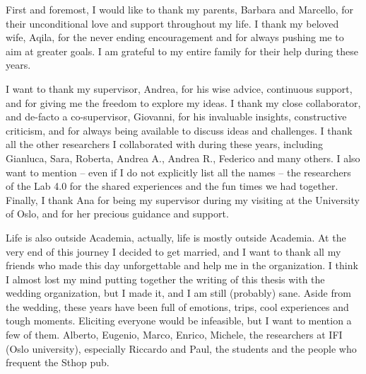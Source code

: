 \documentclass[12pt,a4paper,openright,twoside]{book}
\begin{document}
\begin{acknowledgements} %
    First and foremost, I would like to thank my parents, Barbara and Marcello, for their unconditional love and support throughout my life.
    I thank my beloved wife, Aqila, for the never ending encouragement and for always pushing me to aim at greater goals.
    I am grateful to my entire family for their help during these years.

    I want to thank my supervisor, Andrea, for his wise advice, continuous support, and for giving me the freedom to explore my ideas.
    I thank my close collaborator, and de-facto a co-supervisor, Giovanni, for his invaluable insights, constructive criticism, and for always being available to discuss ideas and challenges.
    I thank all the other researchers I collaborated with during these years, including Gianluca, Sara, Roberta, Andrea A., Andrea R., Federico and many others.
    I also want to mention -- even if I do not explicitly list all the names -- the researchers of the Lab 4.0 for the shared experiences and the fun times we had together.
    Finally, I thank Ana for being my supervisor during my visiting at the University of Oslo, and for her precious guidance and support.

    Life is also outside Academia, actually, life is mostly outside Academia.
    At the very end of this journey I decided to get married, and I want to thank all my friends who made this day unforgettable and help me in the organization.
    I think I almost lost my mind putting together the writing of this thesis with the wedding organization, but I made it, and I am still (probably) sane.
    Aside from the wedding, these years have been full of emotions, trips, cool experiences and tough moments.
    Eliciting everyone would be infeasible, but I want to mention a few of them.
    Alberto, Eugenio, Marco, Enrico, Michele, the researchers at IFI (Oslo university), especially Riccardo and Paul, the students and the people who frequent the Sthop pub.





\end{acknowledgements}

\sloppy

\dominitoc
\tableofcontents   
\listoffigures     %
\listoftables      %
\lstlistoflistings %
\end{document}
